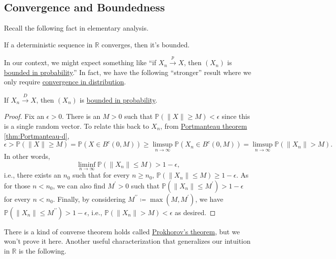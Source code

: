 \subsection{Convergence and Boundedness}
Recall the following fact in elementary analysis.

\begin{prev}
	If a deterministic sequence in \(\mathbb{R} \) converges, then it's bounded.
\end{prev}

In our context, we might expect something like ``if \(X_n \overset{p}{\to } X \), then \((X_n)\) is \hyperref[def:bounded-in-probability]{bounded in probability}.'' In fact, we have the following ``stronger'' result where we only require \hyperref[def:converge-in-distribution]{convergence in distribution}.

\begin{proposition}\label{prop:convergence-in-distirbution-bounded-in-probability}
	If \(X_n \overset{D}{\to } X\), then \((X_n)\) is \hyperref[def:bounded-in-probability]{bounded in probability}.
\end{proposition}
\begin{proof}
	Fix an \(\epsilon > 0\). There is an \(M > 0\) such that \(\mathbb{P} (\lVert X \rVert \geq M) < \epsilon \) since this is a single random vector. To relate this back to \(X_n\), from \hyperref[thm:Portmanteau]{Portmanteau theorem} \autoref{thm:Portmanteau-d},
	\[
		\epsilon
		> \mathbb{P} (\lVert X \rVert \geq M)
		= \mathbb{P} (X \in B^{c} (0, M))
		\geq \limsup_{n \to \infty} \mathbb{P} (X_n \in B^{c} (0, M))
		= \limsup_{n \to \infty} \mathbb{P} (\lVert X_n \rVert > M).
	\]
	In other words,
	\[
		\liminf_{n \to \infty} \mathbb{P} (\lVert X_n \rVert \leq M) > 1 - \epsilon,
	\]
	i.e., there exists an \(n_0\) such that for every \(n \geq n_0\), \(\mathbb{P} (\lVert X_n \rVert \leq M) \geq 1 - \epsilon \). As for those \(n < n_0\), we can also find \(M^{\prime} > 0\) such that \(\mathbb{P} (\lVert X_n \rVert \leq M^{\prime} ) > 1 - \epsilon \) for every \(n < n_0\). Finally, by considering \(M^{\prime\prime} \coloneqq \max (M, M^{\prime} )\), we have \(\mathbb{P} (\lVert X_n \rVert \leq M^{\prime\prime} ) > 1 - \epsilon \), i.e., \(\mathbb{P} (\lVert X_n \rVert > M) < \epsilon \) as desired.
\end{proof}

There is a kind of converse theorem holds called \href{https://en.wikipedia.org/wiki/Prokhorov's_theorem}{Prokhorov's theorem}, but we won't prove it here. Another useful characterization that generalizes our intuition in \(\mathbb{R} \) is the following.

